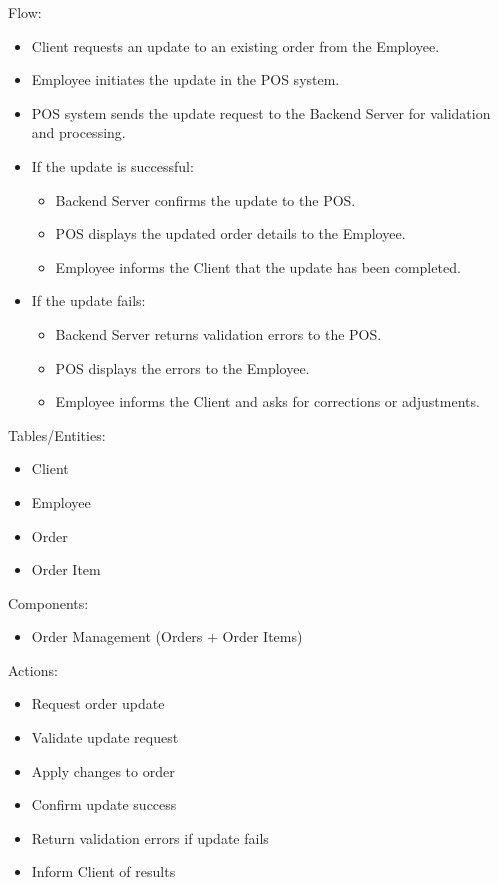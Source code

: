 \documentclass[]{VUMIFTemplateClass}
\begin{document}
Flow:
\begin{itemize}
\setlength{\itemsep}{2pt}
\setlength{\parskip}{0pt}
\setlength{\parsep}{0pt}
\item Client requests an update to an existing order from the Employee.
\item Employee initiates the update in the POS system.
\item POS system sends the update request to the Backend Server for validation and processing.
\item If the update is successful:
\begin{itemize}
\item Backend Server confirms the update to the POS.
\item POS displays the updated order details to the Employee.
\item Employee informs the Client that the update has been completed.
\end{itemize}
\item If the update fails:
\begin{itemize}
\item Backend Server returns validation errors to the POS.
\item POS displays the errors to the Employee.
\item Employee informs the Client and asks for corrections or adjustments.
\end{itemize}
\end{itemize}

Tables/Entities:
\begin{itemize}
\setlength{\itemsep}{2pt}
\setlength{\parskip}{0pt}
\setlength{\parsep}{0pt}
\item Client
\item Employee
\item Order 
\item Order Item 
\end{itemize}

Components:
\begin{itemize}
\setlength{\itemsep}{2pt}
\setlength{\parskip}{0pt}
\setlength{\parsep}{0pt}
\item Order Management (Orders + Order Items)
\end{itemize}

Actions:
\begin{itemize}
\setlength{\itemsep}{2pt}
\setlength{\parskip}{0pt}
\setlength{\parsep}{0pt}
\item Request order update
\item Validate update request
\item Apply changes to order
\item Confirm update success
\item Return validation errors if update fails
\item Inform Client of results
\end{itemize}
\end{document}
